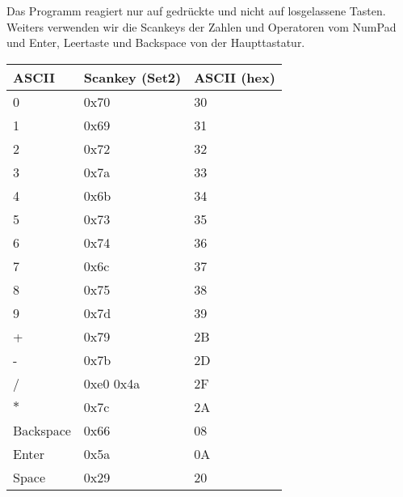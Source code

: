 Das Programm reagiert nur auf gedrückte und nicht auf losgelassene Tasten. Weiters verwenden wir die Scankeys der 
Zahlen und Operatoren vom NumPad und Enter, Leertaste und Backspace von der Haupttastatur.
\begin{center}
\begin{tabular}{|l|l|l|}
\hline ASCII & Scankey (Set2) & ASCII (hex)\\
\hline 0 & 0x70 & 30\\
1 & 0x69 & 31\\
2 & 0x72 & 32\\
3 & 0x7a & 33\\
4 & 0x6b & 34\\
5 & 0x73 & 35\\
6 & 0x74 & 36\\
7 & 0x6c & 37\\
8 & 0x75 & 38\\
9 & 0x7d & 39\\
+ & 0x79 & 2B\\
- & 0x7b & 2D\\
/ & 0xe0 0x4a & 2F\\
$*$ & 0x7c & 2A\\
Backspace & 0x66 & 08\\
Enter & 0x5a & 0A\\
Space & 0x29 & 20\\
\hline

\end{tabular}
\end{center}